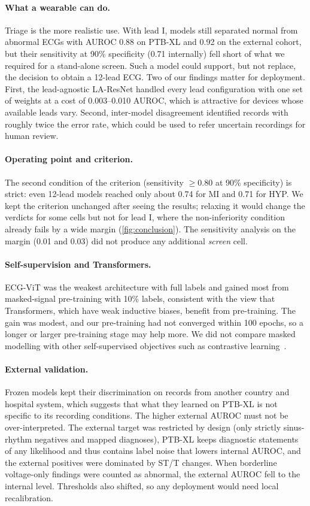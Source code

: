 \paragraph{What a wearable can do.} Triage is the more realistic use. With lead I, models still separated normal from abnormal ECGs with AUROC 0.88 on PTB-XL and 0.92 on the external cohort, but their sensitivity at 90\% specificity (0.71 internally) fell short of what we required for a stand-alone screen. Such a model could support, but not replace, the decision to obtain a 12-lead ECG. Two of our findings matter for deployment. First, the lead-agnostic LA-ResNet handled every lead configuration with one set of weights at a cost of 0.003--0.010 AUROC, which is attractive for devices whose available leads vary. Second, inter-model disagreement identified records with roughly twice the error rate, which could be used to refer uncertain recordings for human review.

\paragraph{Operating point and criterion.} The second condition of the criterion (sensitivity $\geq0.80$ at 90\% specificity) is strict: even 12-lead models reached only about 0.74 for MI and 0.71 for HYP. We kept the criterion unchanged after seeing the results; relaxing it would change the verdicts for some cells but not for lead I, where the non-inferiority condition already fails by a wide margin (\cref{fig:conclusion}). The sensitivity analysis on the margin (0.01 and 0.03) did not produce any additional \emph{screen} cell.

\paragraph{Self-supervision and Transformers.} ECG-ViT was the weakest architecture with full labels and gained most from masked-signal pre-training with 10\% labels, consistent with the view that Transformers, which have weak inductive biases, benefit from pre-training. The gain was modest, and our pre-training had not converged within 100 epochs, so a longer or larger pre-training stage may help more. We did not compare masked modelling with other self-supervised objectives such as contrastive learning~\cite{mehari2022ssl}.

\paragraph{External validation.} Frozen models kept their discrimination on records from another country and hospital system, which suggests that what they learned on PTB-XL is not specific to its recording conditions. The higher external AUROC must not be over-interpreted. The external target was restricted by design (only strictly sinus-rhythm negatives and mapped diagnoses), PTB-XL keeps diagnostic statements of any likelihood and thus contains label noise that lowers internal AUROC, and the external positives were dominated by ST/T changes. When borderline voltage-only findings were counted as abnormal, the external AUROC fell to the internal level. Thresholds also shifted, so any deployment would need local recalibration.

